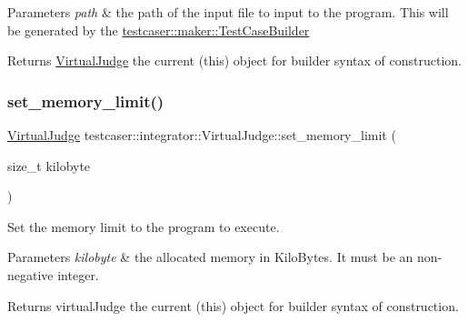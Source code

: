 \begin{DoxyParams}{Parameters}
{\em path} & the path of the input file to input to the program. This will be generated by the \hyperlink{classtestcaser_1_1maker_1_1TestCaseBuilder}{testcaser\+::maker\+::\+Test\+Case\+Builder} \\
\hline
\end{DoxyParams}
\begin{DoxyReturn}{Returns}
\hyperlink{classtestcaser_1_1integrator_1_1VirtualJudge}{Virtual\+Judge} the current (this) object for builder syntax of construction. 
\end{DoxyReturn}
\mbox{\label{classtestcaser_1_1integrator_1_1VirtualJudge_a8ac8e323d9f69fb4e1f6ee2e9aa1ae9f}} 
\subsubsection{\texorpdfstring{set\+\_\+memory\+\_\+limit()}{set\_memory\_limit()}}
{\footnotesize\ttfamily \hyperlink{classtestcaser_1_1integrator_1_1VirtualJudge}{Virtual\+Judge} testcaser\+::integrator\+::\+Virtual\+Judge\+::set\+\_\+memory\+\_\+limit (\begin{DoxyParamCaption}\item[{size\+\_\+t}]{kilobyte }\end{DoxyParamCaption})\hspace{0.3cm}{\ttfamily [inline]}}



Set the memory limit to the program to execute. 


\begin{DoxyParams}{Parameters}
{\em kilobyte} & the allocated memory in Kilo\+Bytes. It must be an non-\/negative integer. \\
\hline
\end{DoxyParams}
\begin{DoxyReturn}{Returns}
virtual\+Judge the current (this) object for builder syntax of construction. 
\end{DoxyReturn}
\mbox{\label{classtestcaser_1_1integrator_1_1VirtualJudge_a9f054aac69019e5f6bde646ccc72effb}} 
